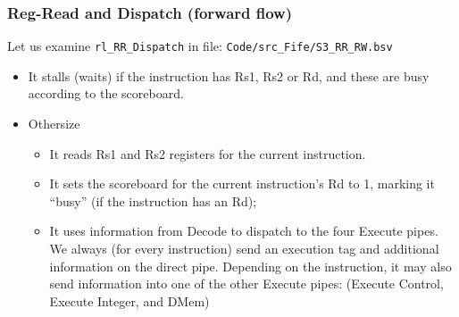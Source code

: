 
\begin{frame}[fragile]
\frametitle{Reg-Read and Dispatch (forward flow)}

\footnotesize

Let us examine {\tt rl\_RR\_Dispatch} in file: {\tt Code/src\_Fife/S3\_RR\_RW.bsv}

\vspace{2ex}

\begin{itemize}

  \item It stalls (waits) if the instruction has Rs1, Rs2 or Rd, and
        these are busy according to the scoreboard.

  \item Othersize

    \begin{itemize}\footnotesize
      \item It reads Rs1 and Rs2 registers for the current instruction.

      \vspace{1ex}

      \item It sets the scoreboard for the current instruction's Rd to
            1, marking it ``busy'' (if the instruction has an Rd);

      \vspace{1ex}

      \item It uses information from Decode to dispatch to the four
            Execute pipes.  We always (for every instruction) send an
            execution tag and additional information on the direct
            pipe.  Depending on the instruction, it may also send
            information into one of the other Execute pipes: (Execute
            Control, Execute Integer, and DMem)
    \end{itemize}

\end{itemize}

\end{frame}


